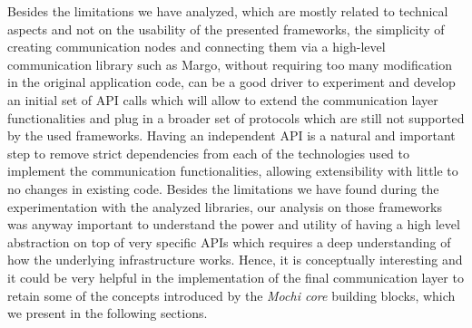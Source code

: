 \documentclass[12pt]{article}
\begin{document}
Besides the limitations we have analyzed, which are mostly related to technical aspects and not on the usability of the presented frameworks, the simplicity of creating communication nodes and connecting them via a high-level communication library such as Margo, without requiring too many modification in the original application code, can be a good driver to experiment and develop an initial set of API calls which will allow to extend the communication layer functionalities and plug in a broader set of protocols which are still not supported by the used frameworks. Having an independent API is a natural and important step to remove strict dependencies from each of the technologies used to implement the communication functionalities, allowing extensibility with little to no changes in existing code.
Besides the limitations we have found during the experimentation with the analyzed libraries, our analysis on those frameworks was anyway important to understand the power and utility of having a high level abstraction on top of very specific APIs which requires a deep understanding of how the underlying infrastructure works. Hence, it is conceptually interesting and it could be very helpful in the implementation of the final communication layer to retain some of the concepts introduced by the \textit{Mochi core} building blocks, which we present in the following sections.\newline
\end{document}
